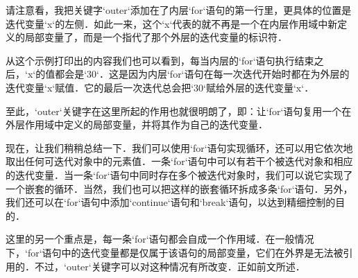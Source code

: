 请注意看，我把关键字`outer`添加在了内层`for`语句的第一行里，更具体的位置是迭代变量`x`的左侧．如此一来，这个`x`代表的就不再是一个在内层作用域中新定义的局部变量了，而是一个指代了那个外层的迭代变量的标识符．

从这个示例打印出的内容我们也可以看到，每当内层的`for`语句执行结束之后，`x`的值都会是`30`．这是因为内层`for`语句在每一次迭代开始时都在为外层的迭代变量`x`赋值．它的最后一次迭代总会把`30`赋给外层的迭代变量`x`．

至此，`outer`关键字在这里所起的作用也就很明朗了，即：让`for`语句复用一个在外层作用域中定义的局部变量，并将其作为自己的迭代变量．

现在，让我们稍稍总结一下．我们可以使用`for`语句实现循环，还可以用它依次地取出任何可迭代对象中的元素值．一条`for`语句中可以有若干个被迭代对象和相应的迭代变量．当一条`for`语句中同时存在多个被迭代对象时，我们可以说它实现了一个嵌套的循环．当然，我们也可以把这样的嵌套循环拆成多条`for`语句．另外，我们还可以在`for`语句中添加`continue`语句和`break`语句，以达到精细控制的目的．

这里的另一个重点是，每一条`for`语句都会自成一个作用域．在一般情况下，`for`语句中的迭代变量都是仅属于该语句的局部变量，它们在外界是无法被引用的．不过，`outer`关键字可以对这种情况有所改变．正如前文所述．

